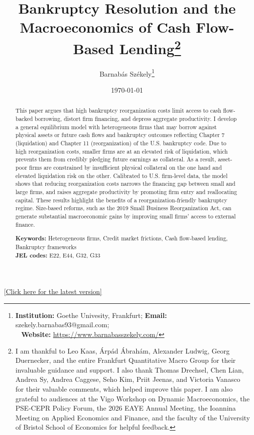 \documentclass[12pt]{article}
\title{\Large{\textbf{Bankruptcy Resolution and the Macroeconomics of Cash Flow-Based Lending}}\thanks{I am thankful to Leo Kaas, Árpád Ábrahám, Alexander Ludwig, Georg Duernecker, and the entire Frankfurt Quantitative Macro Group for their invaluable guidance and support. I also thank Thomas Drechsel, Chen Lian, Andrea Sy, Andrea Caggese, Seho Kim, Priit Jeenas, and Victoria Vanasco for their valuable comments, which helped improve this paper. I am also grateful to audiences at the Vigo Workshop on Dynamic Macroeconomics, the PSE-CEPR Policy Forum, the 2026 EAYE Annual Meeting, the Ioannina Meeting on Applied Economics and Finance, and the faculty of the University of Bristol School of Economics for helpful feedback.} }
\date{}
\begin{document}
\author{\small Barnabás Székely\thanks{\textbf{Institution:} Goethe Univesity, Frankfurt; \qquad \textbf{Email:} szekely.barnabas93@gmail.com;\\ \indent \  \hspace{0.8mm} \textbf{Website:} \url{https://www.barnabasszekely.com/}}}

\date{\small \today}


\maketitle

\vspace{-1.cm}

\begin{center}
    \href{https://barnithehun.github.io/Website/BSzekely_JMP_Draft.pdf}{[Click here for the latest version]}
\end{center}

\begin{abstract}
\noindent \vspace{-0.6cm}


This paper argues that high bankruptcy reorganization costs limit access to cash flow-backed borrowing, distort firm financing, and depress aggregate productivity. I develop a general equilibrium model with heterogeneous firms that may borrow against physical assets or future cash flows and bankruptcy outcomes reflecting Chapter 7 (liquidation) and Chapter 11 (reorganization) of the U.S. bankruptcy code. Due to high reorganization costs, smaller firms are at an elevated risk of liquidation, which prevents them from credibly pledging future earnings as collateral. As a result, asset-poor firms are constrained by insufficient physical collateral on the one hand and elevated liquidation risk on the other. Calibrated to U.S. firm-level data, the model shows that reducing reorganization costs narrows the financing gap between small and large firms, and raises aggregate productivity by promoting firm entry and reallocating capital. These results highlight the benefits of a reorganization-friendly bankruptcy regime. Size-based reforms, such as the 2019 Small Business Reorganization Act, can generate substantial macroeconomic gains by improving small firms' access to external finance.


\bigskip{}
\bigskip{}

\noindent \textbf{Keywords:} Heterogeneous firms, Credit market frictions, Cash flow-based lending, Bankruptcy frameworks \\
\textbf{JEL codes:} E22, E44, G32, G33

\end{abstract}
\thispagestyle{empty}
\setcounter{page}{1}
\end{document}

